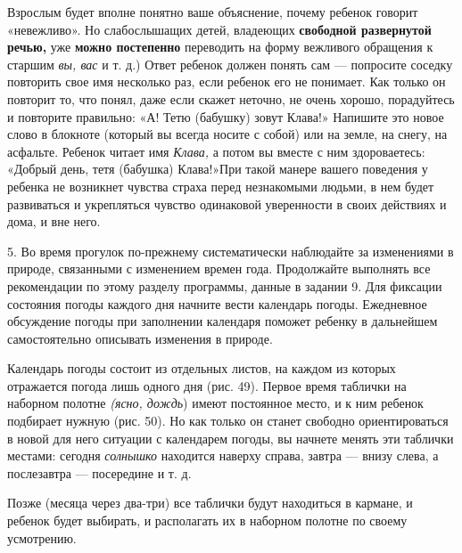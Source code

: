 \documentclass{book}
\renewcommand{\emph}[1]{\textit{#1}}
\begin{document}
Взрослым будет вполне понятно ваше объяснение, почему ребенок говорит
«невежливо». Но слабослышащих детей, владеющих \textbf{свободной
развернутой речью,} уже \textbf{можно постепенно} переводить на форму
вежливого обращения к старшим \emph{вы, вас} и т. д.) Ответ ребенок
должен понять сам --- попросите соседку повторить свое имя несколько
раз, если ребенок его не понимает. Как только он повторит то, что понял,
даже если скажет неточно, не очень хорошо, порадуйтесь и повторите
правильно: «А! Тетю (бабушку) зовут Клава!» Напишите это новое слово в
блокноте (который вы всегда носите с собой) или на земле, на снегу, на
асфальте. Ребенок читает имя \emph{Клава,} а потом вы вместе с ним
здороваетесь: «Добрый день, тетя (бабушка) Клава!»При такой манере
вашего поведения у ребенка не возникнет чувства страха перед незнакомыми
людьми, в нем будет развиваться и укрепляться чувство одинаковой
уверенности в своих действиях и дома, и вне него.

5. Во время прогулок по-прежнему систематически наблюдайте за
изменениями в природе, связанными с изменением времен года. Продолжайте
выполнять все рекомендации по этому разделу программы, данные в задании
9. Для фиксации состояния погоды каждого дня начните вести календарь
погоды. Ежедневное обсуждение погоды при заполнении календаря поможет
ребенку в дальнейшем самостоятельно описывать изменения в природе.

Календарь погоды состоит из отдельных листов, на каждом из которых
отражается погода лишь одного дня (рис. 49). Первое время таблички на
наборном полотне \emph{(ясно, дождь}) имеют постоянное место, и к ним
ребенок подбирает нужную (рис. 50). Но как только он станет свободно
ориентироваться в новой для него ситуации с календарем погоды, вы
начнете менять эти таблички местами: сегодня \emph{солнышко} находится
наверху справа, завтра --- внизу слева, а послезавтра --- посередине и
т. д.

Позже (месяца через два-три) все таблички будут находиться в кармане, и
ребенок будет выбирать, и располагать их в наборном полотне по своему
усмотрению.
\end{document}
